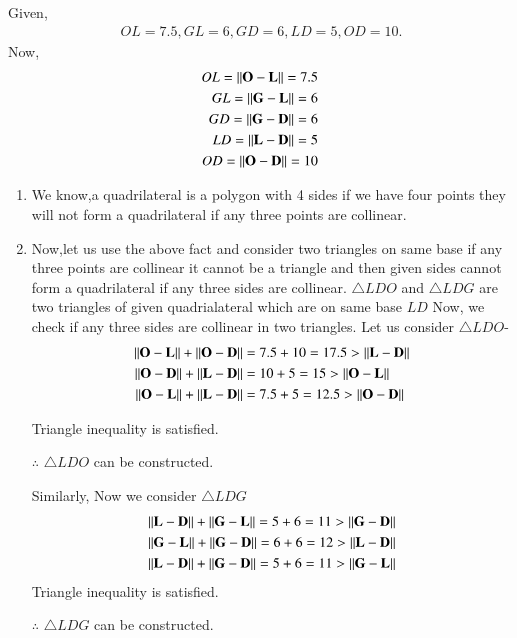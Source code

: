 \documentclass[journal,12pt,twocolumn]{IEEEtran}
\begin{document}
Given,
\begin{align}
\ OL = 7.5, GL = 6, GD = 6, LD = 5, OD = 10 .
\end{align}
Now,
\begin{align}
OL=\left\lVert\mathbf{O}-\mathbf{L}\right\rVert = 7.5
 \\
GL=\left\lVert\mathbf{G}-\mathbf{L}\right\rVert = 6
 \\
GD=\left\lVert\mathbf{G}-\mathbf{D}\right\rVert = 6
 \\
LD=\left\lVert\mathbf{L}-\mathbf{D}\right\rVert = 5
 \\
OD=\left\lVert\mathbf{O}-\mathbf{D}\right\rVert = 10
\end{align}
\begin{enumerate}
\item We know,a quadrilateral is a polygon with 4 sides if we have four points they will not form a quadrilateral if any three points are collinear. 
\item Now,let us use the above fact and consider two triangles on same base if any three points are collinear it cannot be a triangle and then given sides cannot form a quadrilateral if any three sides are collinear.
$\triangle LDO$ and $\triangle LDG$ are two triangles of given quadrialateral which are on same base $LD$ 
Now, we check if any three sides are collinear in two triangles.
Let us consider $\triangle LDO$-
\begin{align}
\left\lVert\mathbf{O}-\mathbf{L}\right\rVert+\left\lVert\mathbf{O}-\mathbf{D}\right\rVert&=7.5+10=17.5> \left\lVert\mathbf{L}-\mathbf{D}\right\rVert\\
\left\lVert\mathbf{O}-\mathbf{D}\right\rVert+\left\lVert\mathbf{L}-\mathbf{D}\right\rVert&=10+5=15>\left\lVert\mathbf{O}-\mathbf{L}\right\rVert\\
\left\lVert\mathbf{O}-\mathbf{L}\right\rVert+\left\lVert\mathbf{L}-\mathbf{D}\right\rVert&=7.5+5=12.5>\left\lVert\mathbf{O}-\mathbf{D}\right\rVert
\end{align}

Triangle inequality is satisfied.

$\therefore$ $\triangle LDO$ can be constructed.

Similarly, Now we consider $\triangle LDG$
\begin{align}
\left\lVert\mathbf{L}-\mathbf{D}\right\rVert + \left\lVert\mathbf{G}-\mathbf{L}\right\rVert = 5 + 6 =11 > \left\lVert\mathbf{G}-\mathbf{D}\right\rVert
\\
\left\lVert\mathbf{G}-\mathbf{L}\right\rVert + \left\lVert\mathbf{G}-\mathbf{D}\right\rVert = 6 + 6 =12 > \left\lVert\mathbf{L}-\mathbf{D}\right\rVert
\\
\left\lVert\mathbf{L}-\mathbf{D}\right\rVert + \left\lVert\mathbf{G}-\mathbf{D}\right\rVert = 5 + 6 =11 > \left\lVert\mathbf{G}-\mathbf{L}\right\rVert
\end{align}
Triangle inequality is satisfied.

$\therefore$ $\triangle LDG$ can be constructed.


\end{enumerate}
\end{document}
